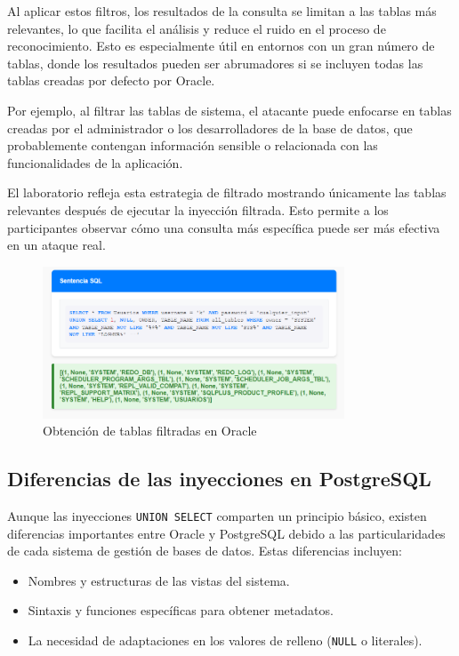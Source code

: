 \documentclass[a4paper,12pt]{article}
\begin{document}
Al aplicar estos filtros, los resultados de la consulta se limitan a las tablas más relevantes, lo que facilita el análisis y reduce el ruido en el proceso de reconocimiento. Esto es especialmente útil en entornos con un gran número de tablas, donde los resultados pueden ser abrumadores si se incluyen todas las tablas creadas por defecto por Oracle.

Por ejemplo, al filtrar las tablas de sistema, el atacante puede enfocarse en tablas creadas por el administrador o los desarrolladores de la base de datos, que probablemente contengan información sensible o relacionada con las funcionalidades de la aplicación.

El laboratorio refleja esta estrategia de filtrado mostrando únicamente las tablas relevantes después de ejecutar la inyección filtrada. Esto permite a los participantes observar cómo una consulta más específica puede ser más efectiva en un ataque real.

\begin{figure}[H]
    \centering
    \includegraphics[width=0.8\textwidth]{Imagenes/union6.png}
    \caption{Obtención de tablas filtradas en Oracle}
\end{figure}

\subsection{Diferencias de las inyecciones en PostgreSQL}

Aunque las inyecciones \texttt{UNION SELECT} comparten un principio básico, existen diferencias importantes entre Oracle y PostgreSQL debido a las particularidades de cada sistema de gestión de bases de datos. Estas diferencias incluyen:
\begin{itemize}
    \item Nombres y estructuras de las vistas del sistema.
    \item Sintaxis y funciones específicas para obtener metadatos.
    \item La necesidad de adaptaciones en los valores de relleno (\texttt{NULL} o literales).
\end{itemize}
\end{document}
